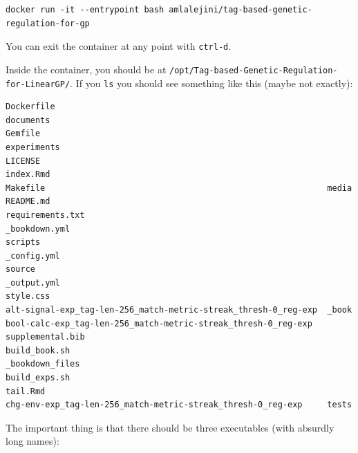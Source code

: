 \documentclass[]{book}
\begin{document}
\begin{verbatim}
docker run -it --entrypoint bash amlalejini/tag-based-genetic-regulation-for-gp
\end{verbatim}

You can exit the container at any point with \texttt{ctrl-d}.

Inside the container, you should be at \texttt{/opt/Tag-based-Genetic-Regulation-for-LinearGP/}.
If you \texttt{ls} you should see something like this (maybe not exactly):

\begin{verbatim}
Dockerfile                                                       documents
Gemfile                                                          experiments
LICENSE                                                          index.Rmd
Makefile                                                         media
README.md                                                        requirements.txt
_bookdown.yml                                                    scripts
_config.yml                                                      source
_output.yml                                                      style.css
alt-signal-exp_tag-len-256_match-metric-streak_thresh-0_reg-exp  _book
bool-calc-exp_tag-len-256_match-metric-streak_thresh-0_reg-exp   supplemental.bib
build_book.sh                                                    _bookdown_files
build_exps.sh                                                    tail.Rmd
chg-env-exp_tag-len-256_match-metric-streak_thresh-0_reg-exp     tests
\end{verbatim}

The important thing is that there should be three executables (with absurdly long names):
\end{document}
